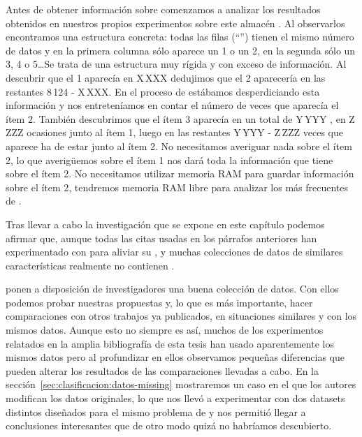 Antes de obtener información sobre \mushroom comenzamos a analizar los resultados obtenidos en nuestros propios experimentos sobre este almacén \D. Al observarlos encontramos una estructura concreta: todas las filas ("`\transacciones"') tienen el mismo número de datos y en la primera columna sólo aparece un 1 o un 2, en la segunda sólo un 3, 4 o 5\ldots Se trata de una estructura muy rígida y con exceso de información. Al descubrir que el 1 aparecía en X\,XXX \transacciones dedujimos que el 2 aparecería en las restantes 8\,124 - X\,XXX. En el proceso de \fim estábamos desperdiciando esta información y nos entreteníamos en contar el número de veces que aparecía el ítem 2. También descubrimos que el ítem 3 aparecía en un total de Y\,YYY \transacciones, en Z\,ZZZ ocasiones junto al ítem 1, luego en las restantes Y\,YYY - Z\,ZZZ veces que aparece ha de estar junto al ítem 2. No necesitamos averiguar nada sobre el ítem 2, lo que averigüemos sobre el ítem 1 nos dará toda la información que tiene \D sobre el ítem 2. No necesitamos utilizar memoria RAM para guardar información sobre el ítem 2, tendremos memoria RAM libre para analizar los \irs más frecuentes de \D.

Tras llevar a cabo la investigación que se expone en este capítulo podemos afirmar que, aunque todas las citas usadas en los párrafos anteriores han experimentado con \mushroom para aliviar su \dilemaIR, \mushroom y muchas colecciones de datos de similares características realmente no contienen \IRs.


\cite{Lichman-UCI-2013} ponen a disposición de investigadores una buena colección de datos. Con ellos podemos probar nuestras propuestas y, lo que es más importante, hacer comparaciones con otros trabajos ya publicados, en situaciones similares y con los mismos datos. Aunque esto no siempre es así, muchos de los experimentos relatados en la amplia bibliografía de esta tesis han usado aparentemente los mismos datos pero al profundizar en ellos observamos pequeñas diferencias que pueden alterar los resultados de las comparaciones llevadas a cabo. En la sección~\ref{sec:clasificacion:datos-missing} mostraremos un caso en el que los autores modifican los datos originales, lo que nos llevó a experimentar con dos datasets distintos diseñados para el mismo problema de \clasificacion y nos permitió llegar a conclusiones interesantes que de otro modo quizá no habríamos descubierto.


